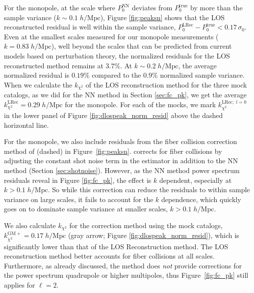 For the monopole, at the scale where $P^\mathrm{NN}_0$ deviates from 
$P^\mathrm{true}_0$ by more than the sample variance ($k \sim 0.1\;h/\mathrm{Mpc}$), 
Figure \ref{fig:peaksn} shows that the LOS reconstructed residual is well within the 
sample variance, $P^\mathrm{LRec}_0 - P^\mathrm{true}_0 < 0.17\, \sigma_0$. 
Even at the smallest scales measured for our monopole measurements 
($k = 0.83\;h/\mathrm{Mpc}$), well beyond the scales that can be predicted from current models based on perturbation theory, the normalized residuals for 
the LOS reconstructed method remains at $3.7\%$. At $k \sim 0.2\;h/\mathrm{Mpc}$, the average normalized 
residual is $0.19\%$ compared to the $0.9\%$ normalized sample variance. 
When we calculate the $k_{\chi^2}$ of the LOS reconstruction method for 
the three mock catalogs, as we did for the NN method in Section \ref{sec:fc_pk}, 
we get the average $k_{\chi^2}^\mathrm{LRec} = 0.29\;h/\mathrm{Mpc}$ for the monopole. 
For each of the mocks, we mark $k_{\chi^2}^{\mathrm{LRec};\;l=0}$ in the lower panel 
of Figure \ref{fig:dlospeak_norm_resid} above the dashed horizontal line. 


For the monopole, we also include residuals from the 
fiber collision correction method of \cite{Gil-Marin:2014aa} (dashed) in 
Figure~\ref{fig:peaksn}.
\cite{Gil-Marin:2014aa} corrects for fiber collisions by adjusting the 
constant shot noise term in the estimator in addition to the NN method 
(Section \ref{sec:shotnoise}).
However, as the NN method power spectrum residuals reveal in 
Figure \ref{fig:fc_pk}, the effect is $k$ dependent, especially 
at $k > 0.1 \;h/\mathrm{Mpc}$. 
So while this correction can reduce the residuals 
to within sample variance on large scales, it fails to account for 
the $k$ dependence, which quickly goes on to dominate sample variance 
at smaller scales, $k > 0.1 \;h/\mathrm{Mpc}$.

We also calculate $k_{\chi^2}$ for the \cite{Gil-Marin:2014aa} 
correction method using the mock catalogs, 
$k_{\chi^2}^\mathrm{GM+} = 0.17 \;h/\mathrm{Mpc}$ (gray arrow; Figure \ref{fig:dlospeak_norm_resid}), 
which is significantly lower than that of the LOS Reconstruction method. 
The LOS reconstruction method better accounts for fiber collisions at all 
scales. Furthermore, as already discussed, the \cite{Gil-Marin:2014aa} 
method does {\em not} provide corrections for the power spectrum 
quadrupole or higher multipoles, thus Figure~\ref{fig:fc_pk} still applies for $\ell=2$.

